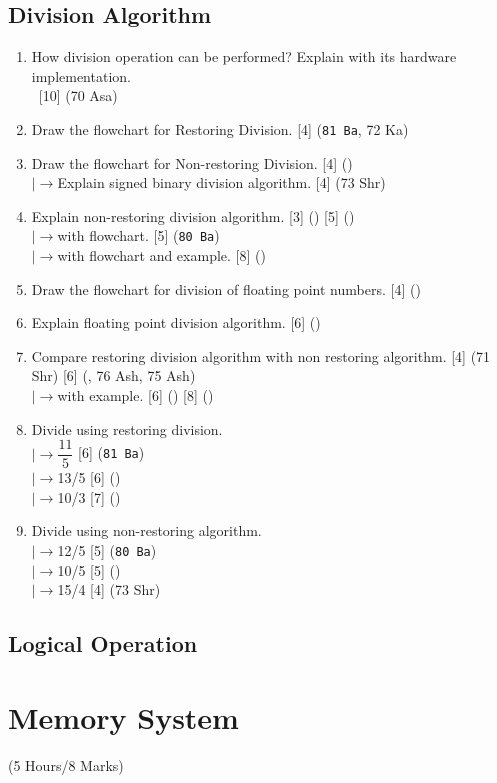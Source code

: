 \documentclass[12pt]{article}
\newcommand{\lb}{\\$\left|\rightarrow\right.$}
\newcommand{\enter}{\\\textcolor{white}{1}}
\begin{document}
	\subsection{Division Algorithm}
		\begin{enumerate}[noitemsep, topsep=0pt]
			\item How division operation can be performed? Explain with its hardware implementation. 
			\enter\hfill [10] (70 Asa)		
		
			\item Draw the flowchart for Restoring Division. \hfill [4] (\texttt{81 Ba}, 72 Ka)
			
			\item Draw the flowchart for Non-restoring Division. \hfill [4] ()
			\lb Explain signed binary division algorithm. \hfill [4] (73 Shr)
			
			\item Explain non-restoring division algorithm. \hfill [3] () [5] ()
			\lb with flowchart. \hfill [5] (\texttt{80 Ba})
			\lb with flowchart and example. \hfill [8] ()
			
			\item Draw the flowchart for division of floating point numbers. \hfill [4] ()
			
			\item Explain floating point division algorithm. \hfill [6] ()
			
			\item Compare restoring division algorithm with non restoring algorithm. \hfill [4] (71 Shr) [6] (, 76 Ash, 75 Ash)
			\lb with example. \hfill [6] () [8] ()
			
			\item Divide using restoring division. 
				\lb $\dfrac{11}{5}$ \hfill [6] (\texttt{81 Ba})
				\lb 13/5 \hfill [6] ()
				\lb 10/3 \hfill [7] ()

			\item Divide using non-restoring algorithm.
				\lb 12/5 \hfill [5] (\texttt{80 Ba})
				\lb 10/5 \hfill [5] ()
				\lb 15/4 \hfill [4] (73 Shr)
		\end{enumerate}
	\subsection{Logical Operation}

	\pagebreak
\section{Memory System}
\begin{center}(5 Hours/8 Marks)\end{center}
\end{document}
